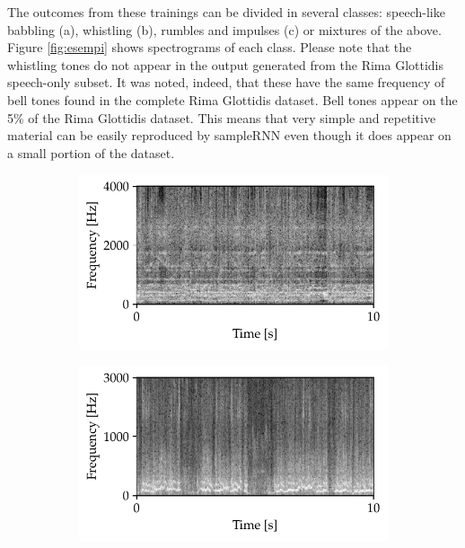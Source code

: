 The outcomes from these trainings can be divided in several classes: speech-like babbling (a), whistling (b), rumbles and impulses (c) or mixtures of the above. Figure \ref{fig:esempi} shows spectrograms of each class. Please note that the whistling tones do not appear in the output generated from the Rima Glottidis speech-only subset. It was noted, indeed, that these have the same frequency of bell tones found in the complete Rima Glottidis dataset. Bell tones appear on the 5\% of the Rima Glottidis dataset. This means that very simple and repetitive material can be easily reproduced by sampleRNN even though it does appear on a small portion of the dataset.
\begin{figure}[h]
	\centering
	
	\begin{subfigure}[b]{0.45\columnwidth}
		\includegraphics[width=\textwidth]{img/choral.pdf}
		\subcaption{}
	\end{subfigure}	
	\begin{subfigure}[b]{0.45\columnwidth}
		\includegraphics[width=\textwidth]{img/speech2.pdf}
		\subcaption{}
	\end{subfigure}
	

\end{figure}
